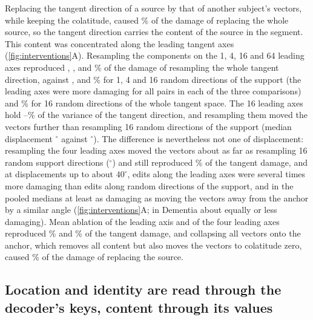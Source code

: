 \documentclass[10pt,letterpaper]{article}
\begin{document}
Replacing the tangent direction of a source by that of another subject's vectors, while
keeping the colatitude, caused \TangentOverSourceMedianPct\% of the damage of replacing the
whole source, so the tangent direction carries the content of the source in the segment. This
content was concentrated along the leading tangent axes (\cref{fig:interventions}A). Resampling
the components on the 1, 4, 16 and 64 leading axes reproduced \ShareTPConeMedianPct,
\ShareTPCfourMedianPct, \ShareTPCsixteenMedianPct{} and \ShareTPCsixtyfourMedianPct\% of the
damage of resampling the whole tangent direction, against \ShareRandoneMedianPct,
\ShareRandfourMedianPct{} and \ShareRandsixteenMedianPct\% for 1, 4 and 16 random directions of
the support (the leading axes were more damaging for all \SourceCohortPairs{} pairs in each of the
three comparisons\GuardTPCAll) and \ShareRandOffMedianPct\% for 16
random directions of the whole tangent space. The 16 leading axes hold
\TangentSixteenMin--\TangentSixteenMax\% of the variance of the tangent direction, and resampling
them moved the vectors further than resampling 16 random directions of the support (median
displacement \DispTPCsixteen$^\circ$ against \DispRandsixteen$^\circ$). The difference is
nevertheless not one of displacement: resampling the four leading axes moved the vectors about as
far as resampling 16 random support directions (\DispTPCfour$^\circ$) and still reproduced
\ShareTPCfourMedianPct\% of the tangent damage, and at displacements up to about $40^\circ$, edits
along the leading axes were several times more damaging than edits along random directions of the
support, and in the pooled medians at least as damaging as moving the vectors away from the anchor
by a similar angle (\cref{fig:interventions}A; in Dementia about equally or less damaging). Mean ablation of
the leading axis and of the four leading axes reproduced \ShareTPCMeanOneMedianPct\% and
\ShareTPCMeanFourMedianPct\% of the tangent damage, and collapsing all vectors onto the anchor,
which removes all content but also moves the vectors to colatitude zero, caused \PoleOverSourcePct\% of
the damage of replacing the source.

\subsection*{Location and identity are read through the decoder's keys, content through its values}\label{sec:res-routing}
\end{document}
